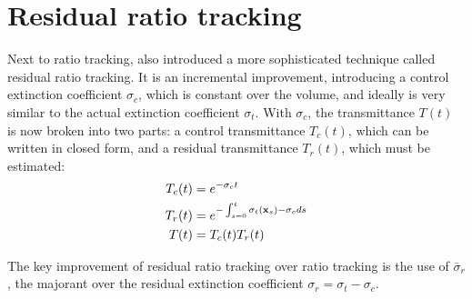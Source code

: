 \section{Residual ratio tracking}\label{appendix:residual-ratio-tracking}
Next to ratio tracking, \cite{novak2014residual} also introduced a more sophisticated technique called residual ratio tracking. It is an incremental improvement, introducing a control extinction coefficient $\sigma_c$, which is constant over the volume, and ideally is very similar to the actual extinction coefficient $\sigma_t$. With $\sigma_c$, the transmittance $T(t)$ is now broken into two parts: a control transmittance $T_c(t)$, which can be written in closed form, and a residual transmittance $T_r(t)$, which must be estimated:
\begin{align}
\begin{aligned}
    T_c(t) &= e^{-\sigma_c t}\\
    T_r(t) &= e^{-\int^t_{s=0} \sigma_t(\textbf{x}_s)-\sigma_c ds }\\
    T(t)   &= T_c(t) T_r(t)
\end{aligned}
\end{align}

The key improvement of residual ratio tracking  over ratio tracking is the use of $\bar\sigma_r$, the majorant over the residual extinction coefficient $\sigma_r = \sigma_t - \sigma_c$. 

